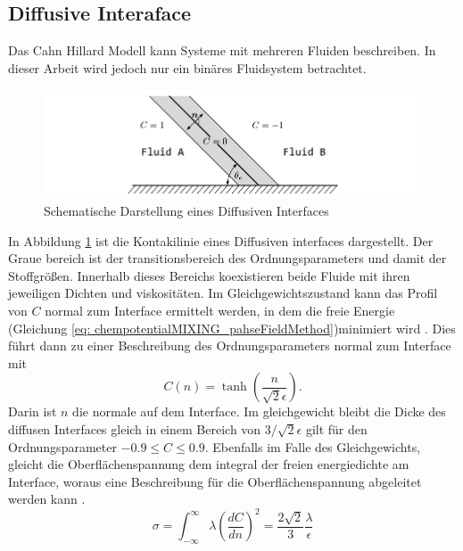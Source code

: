 \subsection{Diffusive Interaface}
Das Cahn Hillard Modell kann Systeme mit mehreren Fluiden beschreiben. In dieser Arbeit wird jedoch nur ein binäres Fluidsystem betrachtet. 
\begin{figure}[h]
    \centering
    \includegraphics[width=.95\textwidth]{Pictures/DiffusiveInterface.pdf}
    \caption{Schematische Darstellung eines Diffusiven Interfaces}
    \label{fig: DiffusiveInteraface}
\end{figure}
In Abbildung \ref{fig: DiffusiveInteraface} ist die Kontakilinie eines Diffusiven interfaces dargestellt. Der Graue bereich ist der transitionsbereich des Ordnungsparameters und damit der Stoffgrößen. Innerhalb dieses Bereichs koexistieren beide Fluide mit ihren jeweiligen Dichten und viskositäten. Im Gleichgewichtszustand kann das Profil von $C$ normal zum Interface ermittelt werden, in dem die freie Energie (Gleichung \ref{eq: chempotentialMIXING_pahseFieldMethod})minimiert wird \cite{cai2015NumericalSimulationWetting}. Dies führt dann zu einer Beschreibung des Ordnungsparameters normal zum Interface mit
\begin{equation}
    \label{eq: InterfactialNormalDirProfile}
    C(n) = \tanh\left(\frac{n}{\sqrt{2}\epsilon}\right).
\end{equation}
Darin ist $n$ die normale auf dem Interface. Im gleichgewicht bleibt die Dicke des diffusen Interfaces gleich in einem Bereich von $3/\sqrt{2}\epsilon$ gilt für den Ordnungsparameter $-0.9\leq C\leq0.9$. Ebenfalls im Falle des Gleichgewichts, gleicht die Oberflächenspannung dem integral der freien energiedichte am Interface, woraus eine Beschreibung für die Oberflächenspannung abgeleitet werden kann \cite{jacqmin2000ContactlineDynamicsDiffuse}. 
\begin{equation}
\label{eq: surfacetensionEqui}
    \sigma = \int_{-\infty}^{\infty}\lambda\left( \frac{dC}{dn}  \right)^{2}= \frac{2\sqrt{2}}{3} \frac{\lambda}{\epsilon}
\end{equation}



